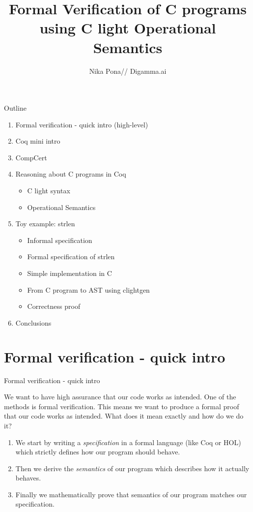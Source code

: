 \documentclass{beamer}
\title{Formal Verification of C programs using C light Operational Semantics}
\author{Nika Pona// Digamma.ai}
\begin{document}
\maketitle

\begin{frame}{Outline}
\begin{enumerate}
\item Formal verification - quick intro (high-level)
\item Coq mini intro 
\item CompCert

\item Reasoning about C programs in Coq
  \begin{itemize}
    \item C light syntax
   \item Operational Semantics
\end{itemize}
\item Toy example: strlen 
\begin{itemize}
\item Informal specification 
\item Formal specification of strlen 
\item Simple implementation in C
\item From C program to AST using clightgen
\item Correctness proof
\end{itemize}
\item Conclusions
\end{enumerate} 
\end{frame}

\section{Formal verification - quick intro}
\begin{frame}{Formal verification - quick intro}
 
  We want to have high assurance that our code works as intended. One of the methods is formal verification. This means we want to produce a formal proof that our code works as intended. What does it mean exactly and how do we do it?
  
  \begin{enumerate}
  \item We start by writing a \emph{specification} in a formal language (like Coq or HOL) which strictly defines how our program should behave.
  \item Then we derive the \emph{semantics} of our program which describes how it actually behaves. 
  \item Finally we mathematically prove that semantics of our program matches our specification.
\end{enumerate}
  
\end{frame}
\end{document}
